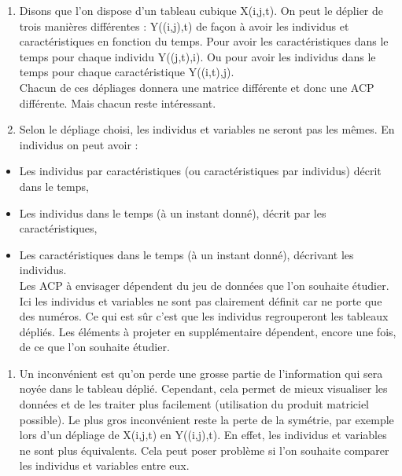 \documentclass[
]{article}
\providecommand{\tightlist}{%
  \setlength{\itemsep}{0pt}\setlength{\parskip}{0pt}}
\begin{document}
\begin{enumerate}
\def\labelenumi{\alph{enumi})}
\item
  Disons que l'on dispose d'un tableau cubique X(i,j,t). On peut le
  déplier de trois manières différentes : Y((i,j),t) de façon à avoir
  les individus et caractéristiques en fonction du temps. Pour avoir les
  caractéristiques dans le temps pour chaque individu Y((j,t),i). Ou
  pour avoir les individus dans le temps pour chaque caractéristique
  Y((i,t),j).\\
  Chacun de ces dépliages donnera une matrice différente et donc une ACP
  différente. Mais chacun reste intéressant.
\item
  Selon le dépliage choisi, les individus et variables ne seront pas les
  mêmes. En individus on peut avoir :\\
\end{enumerate}

\begin{itemize}
\tightlist
\item
  Les individus par caractéristiques (ou caractéristiques par individus)
  décrit dans le temps,\\
\item
  Les individus dans le temps (à un instant donné), décrit par les
  caractéristiques,\\
\item
  Les caractéristiques dans le temps (à un instant donné), décrivant les
  individus.\\
  Les ACP à envisager dépendent du jeu de données que l'on souhaite
  étudier. Ici les individus et variables ne sont pas clairement définit
  car ne porte que des numéros. Ce qui est sûr c'est que les individus
  regrouperont les tableaux dépliés. Les éléments à projeter en
  supplémentaire dépendent, encore une fois, de ce que l'on souhaite
  étudier.
\end{itemize}

\begin{enumerate}
\def\labelenumi{\alph{enumi})}
\setcounter{enumi}{2}
\tightlist
\item
  Un inconvénient est qu'on perde une grosse partie de l'information qui
  sera noyée dans le tableau déplié. Cependant, cela permet de mieux
  visualiser les données et de les traiter plus facilement (utilisation
  du produit matriciel possible). Le plus gros inconvénient reste la
  perte de la symétrie, par exemple lors d'un dépliage de X(i,j,t) en
  Y((i,j),t). En effet, les individus et variables ne sont plus
  équivalents. Cela peut poser problème si l'on souhaite comparer les
  individus et variables entre eux.
\end{enumerate}
\end{document}
